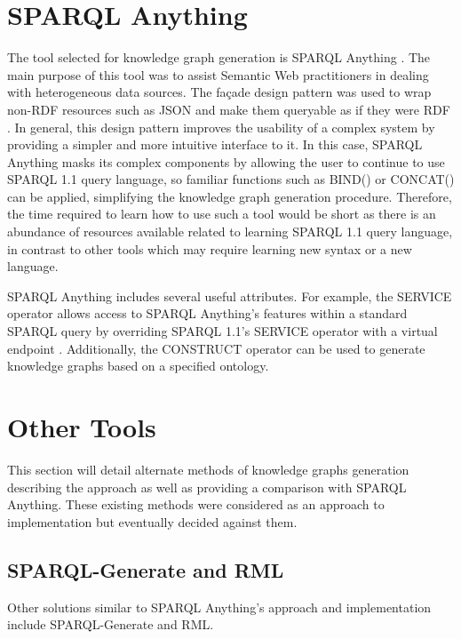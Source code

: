 \section{SPARQL Anything}
\hspace{0.5cm} The tool selected for knowledge graph generation is SPARQL Anything \cite{sparqlanythinggithub}. The main purpose of this tool was to assist Semantic Web practitioners in dealing with heterogeneous data sources. The fa\c{c}ade design pattern was used to wrap non-RDF resources such as JSON and make them queryable as if they were RDF \cite{sparqlanything}. In general, this design pattern improves the usability of a complex system by providing a simpler and more intuitive interface to it. In this case, SPARQL Anything masks its complex components by allowing the user to continue to use SPARQL 1.1 query language, so familiar functions such as BIND() or CONCAT() can be applied, simplifying the knowledge graph generation procedure. Therefore, the time required to learn how to use such a tool would be short as there is an abundance of resources available related to learning SPARQL 1.1 query language, in contrast to other tools which may require learning new syntax or a new language. 

SPARQL Anything includes several useful attributes. For example, the SERVICE operator allows access to SPARQL Anything's features within a standard SPARQL query by overriding SPARQL 1.1's SERVICE operator with a virtual endpoint \cite{asprino2023knowledge}. Additionally, the CONSTRUCT operator can be used to generate knowledge graphs based on a specified ontology. 

\section{Other Tools}
\hspace{0.5cm} This section will detail alternate methods of knowledge graphs generation describing the approach as well as providing a comparison with SPARQL Anything. These existing methods were considered as an approach to implementation but eventually decided against them. 

\subsection{SPARQL-Generate and RML}
\hspace{0.5cm} Other solutions similar to SPARQL Anything's approach and implementation include SPARQL-Generate and RML. 

